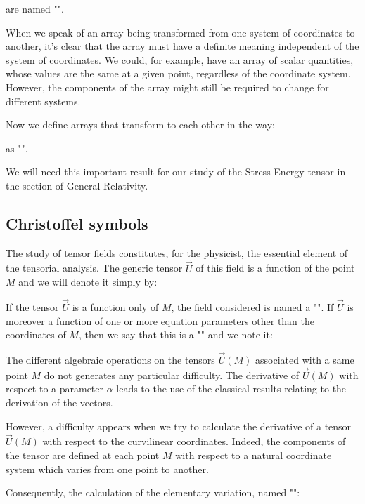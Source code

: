 	 are named "".
	 
	 When we speak of an array being transformed from one system of coordinates to another, it's clear that the array must have a definite meaning independent of the system of coordinates. We could, for example, have an array of scalar quantities, whose values are the same at a given point, regardless of the coordinate system. However, the components of the array might still be required to change for different systems.
	 
	 Now we define arrays that transform to each other in the way:
	
	 as "".
	
	We will need this important result for our study of the Stress-Energy tensor in the section of General Relativity.
	
	\pagebreak
	\subsection{Christoffel symbols}
	The study of tensor fields constitutes, for the physicist, the essential element of the tensorial analysis. The generic tensor $\vec{U}$ of this field is a function of the point $M$ and we will denote it simply by:
	
If the tensor $\vec{U}$ is a function only of $M$, the field considered is named a "". If $\vec{U}$ is moreover a function of one or more equation parameters other than the coordinates of $M$, then we say that this is a "" and we note it:
	
	The different algebraic operations on the tensors $\vec{U}(M)$ associated with a same point $M$ do not generates any particular difficulty. The derivative of $\vec{U}(M)$ with respect to a parameter $\alpha$ leads to the use of the classical results relating to the derivation of the vectors.
	
	However, a difficulty appears when we try to calculate the derivative of a tensor $\vec{U}(M)$ with respect to the curvilinear coordinates. Indeed, the components of the tensor are defined at each point $M$ with respect to a natural coordinate system which varies from one point to another.

	Consequently, the calculation of the elementary variation, named "":
	
